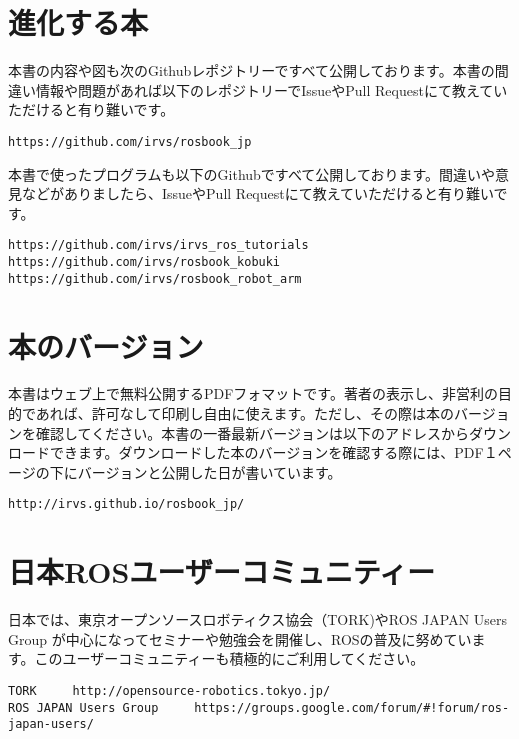 \section*{進化する本}

本書の内容や図も次のGithubレポジトリーですべて公開しております。本書の間違い情報や問題があれば以下のレポジトリーでIssueやPull Requestにて教えていただけると有り難いです。

\begin{lstlisting}
https://github.com/irvs/rosbook_jp
\end{lstlisting}

\noindent 本書で使ったプログラムも以下のGithubですべて公開しております。間違いや意見などがありましたら、IssueやPull Requestにて教えていただけると有り難いです。

\begin{lstlisting}
https://github.com/irvs/irvs_ros_tutorials
https://github.com/irvs/rosbook_kobuki
https://github.com/irvs/rosbook_robot_arm
\end{lstlisting}

\section*{本のバージョン}

本書はウェブ上で無料公開するPDFフォマットです。著者の表示し、非営利の目的であれば、許可なして印刷し自由に使えます。ただし、その際は本のバージョンを確認してください。本書の一番最新バージョンは以下のアドレスからダウンロードできます。ダウンロードした本のバージョンを確認する際には、PDF１ページの下にバージョンと公開した日が書いています。

\begin{lstlisting}
http://irvs.github.io/rosbook_jp/
\end{lstlisting}

\section*{日本ROSユーザーコミュニティー}

日本では、東京オープンソースロボティクス協会（TORK)やROS JAPAN Users Group が中心になってセミナーや勉強会を開催し、ROSの普及に努めています。このユーザーコミュニティーも積極的にご利用してください。

\begin{lstlisting}
TORK     http://opensource-robotics.tokyo.jp/
ROS JAPAN Users Group     https://groups.google.com/forum/#!forum/ros-japan-users/
\end{lstlisting}

